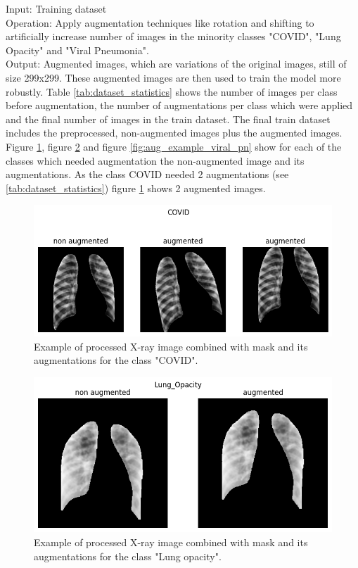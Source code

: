 \documentclass{article}
\begin{document}
Input: Training dataset \\%
Operation: Apply augmentation techniques like rotation and shifting to artificially increase number of images in the minority classes "COVID", "Lung Opacity" and 
"Viral Pneumonia".\\
Output: Augmented images, which are variations of the original images, still of size 299x299. These augmented images are then used to train the model more robustly. 
Table \ref{tab:dataset_statistics} shows the number of images per class before augmentation, the number of augmentations per class which were applied and the
final number of images in the train dataset. The final train dataset includes the preprocessed, non-augmented images plus the augmented images.\\
Figure \ref{fig:aug_example_covid}, figure \ref{fig:aug_example_lung_opcacity} and figure \ref{fig:aug_example_viral_pn} show for each of the classes which needed 
augmentation the non-augmented image and its augmentations. As the class COVID needed 2 augmentations (see \ref{tab:dataset_statistics}) figure \ref{fig:aug_example_covid} 
shows 2 augmented images. 


\begin{figure}[!htb] %
    \centering
    \includegraphics[width=1.0\linewidth]{aug_example_covid.png}
    \caption{Example of processed X-ray image combined with mask and its augmentations for the class "COVID".}
    \label{fig:aug_example_covid}
\end{figure}

\begin{figure}[H] %
    \centering
    \includegraphics[width=0.65\linewidth]{aug_example_lung_opcacity.png}
    \caption{Example of processed X-ray image combined with mask and its augmentations for the class "Lung opacity".}
    \label{fig:aug_example_lung_opcacity}
\end{figure}
\end{document}
